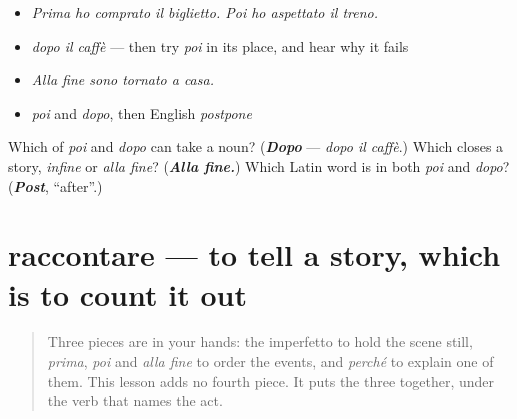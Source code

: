 \begin{itemize}
\raggedright
  \item \emph{Prima ho comprato il biglietto. Poi ho aspettato il treno.}
  \item \emph{dopo il caffè} — then try \emph{poi} in its place, and hear why it fails
  \item \emph{Alla fine sono tornato a casa.}
  \item \emph{poi} and \emph{dopo}, then English \emph{postpone}
\end{itemize}

\begin{tcolorbox}[breakable,colback=teal!4,colframe=teal!35!black,title={Before you move on}]
Which of \emph{poi} and \emph{dopo} can take a noun? (\emph{\textbf{Dopo}} — \emph{dopo il caffè}.) Which closes a story, \emph{infine} or \emph{alla fine}? (\emph{\textbf{Alla fine.}}) Which Latin word is in both \emph{poi} and \emph{dopo}? (\emph{\textbf{Post}}, \textquotedblleft{}after\textquotedblright{}.)
\end{tcolorbox}
\section[raccontare]{raccontare — to tell a story, which is to count it out}

\label{lesson:IT-C264-raccontare}



\begin{quote}
Three pieces are in your hands: the imperfetto to hold the scene still, \emph{prima}, \emph{poi} and \emph{alla fine} to order the events, and \emph{perché} to explain one of them. This lesson adds no fourth piece. It puts the three together, under the verb that names the act.
\end{quote}


